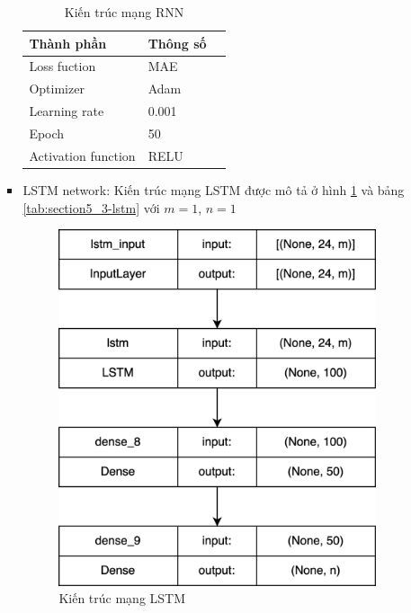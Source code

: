 \begin{itemize}
\begin{itemize}
\begin{itemize}
                    \newpage
                    
                    \begin{table}[h]
                        \caption{Kiến trúc mạng RNN}
                        \centering
                        \begin{tabular}{|l|l|c|}
                        \hline
                    Thành phần  &  Thông số \\
                          \hline
                     Loss fuction & MAE \\
                     Optimizer & Adam\\
                    Learning rate & 0.001 \\
                     Epoch & 50 \\
                     Activation function & RELU \\
                    \hline
                        \end{tabular}
                        \label{tab:section5_3-rnn}
                    \end{table}
                    
                    \item LSTM network: Kiến trúc mạng LSTM được mô tả ở hình \ref{fig:section5_3_lstm} và bảng \ref{tab:section5_3-lstm} với $m=1$, $n=1$
                    \begin{figure}[h]
                        \centering
                        \includegraphics[width=0.6\linewidth]{image/section5_3/lstm.drawio.png}
                        \caption{Kiến trúc mạng LSTM}
                        \label{fig:section5_3_lstm}
                    \end{figure}
                    

\end{itemize}
\end{itemize}
\end{itemize}
